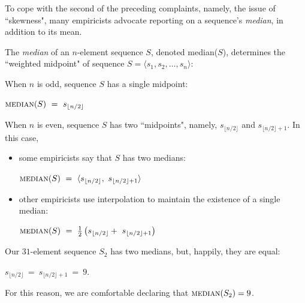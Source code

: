 \bigskip

To cope with the second of the preceding complaints, namely, the issue of ``skewness", many empiricists advocate reporting on a sequence's {\it median}, in addition to its mean.

\noindent
The {\em median} of an $n$-element sequence $S$, denoted {\sc median}($S$), determines 
the ``weighted midpoint" of  sequence $S = \langle s_1, s_2, \ldots, s_n \rangle$:

\medskip

\noindent When $n$ is odd, sequence $S$ has a single midpoint:

\hspace*{.35in}
$\mbox{\sc median}(S)  \ = \ s_{\lfloor n/2 \rfloor}$

\bigskip

\noindent When $n$ is even, sequence $S$ has two ``midpoints", namely, $s_{\lfloor n/2 \rfloor}$
and $s_{\lfloor n/2 \rfloor +1}$.  In this case,
\begin{itemize}
\item
some empiricists say that $S$ has two medians:

\hspace*{.35in}
$\mbox{\sc median}(S)  \ = \ \langle s_{\lfloor n/2 \rfloor}, \ s_{\lfloor n/2 \rfloor +1} \rangle$

\item
other empiricists use interpolation to maintain the existence of a single median:

\hspace*{.35in}
$\mbox{\sc median}(S)  \ = \ {1 \over 2} \left(s_{\lfloor n/2 \rfloor} + \ s_{\lfloor n/2 \rfloor +1} \right)$
\end{itemize}
Our $31$-element sequence $S_2$ has two medians, but, happily, they are equal:

\hspace*{.35in}
$s_{\lfloor n/2 \rfloor} \ = \ s_{\lfloor n/2 \rfloor +1} \ = \ 9$.  

\noindent
For this reason, we are comfortable declaring that $\mbox{\sc median}(S_2) = 9$.

\bigskip

\noindent {}
\bigskip

